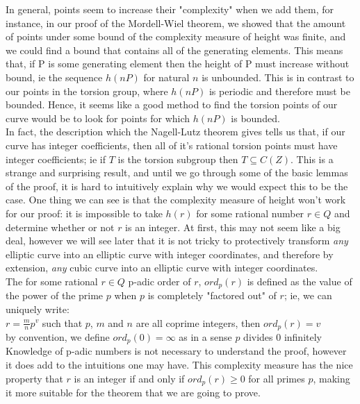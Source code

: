 \documentclass{article}
\begin{document}
In general, points seem to increase their "complexity" when we add them, for instance, in our proof of the Mordell-Wiel theorem, we showed that the amount of points under some bound of the complexity measure of height was finite, and we could find a bound that contains all of the generating elements. This means that, if P is some generating element then the height of P must increase without bound, ie the sequence $h(nP)$ for natural $n$ is unbounded. This is in contrast to our points in the torsion group, where $h(nP)$ is periodic and therefore must be bounded. Hence, it seems like a good method to find the torsion points of our curve would be to look for points for which $h(nP)$ is bounded.\\

In fact, the description which the Nagell-Lutz theorem gives tells us that, if our curve has integer coefficients, then all of it's rational torsion points must have integer coefficients; ie if $T$ is the torsion subgroup then $T \subseteq C(Z)$. This is a strange and surprising result, and until we go through some of the basic lemmas of the proof, it is hard to intuitively explain why we would expect this to be the case. One thing we can see is that the complexity measure of height won't work for our proof: it is impossible to take $h(r)$ for some rational number $r \in Q$ and determine whether or not $r$ is an integer. At first, this may not seem like a big deal, however we will see later that it is not tricky to protectively transform \emph{any} elliptic curve into an elliptic curve with integer coordinates, and therefore by extension, \emph{any} cubic curve into an elliptic curve with integer coordinates.\\

The for some rational $r \in Q$ p-adic order of $r$, $ord_p(r)$ is defined as the value of the power of the prime $p$ when $p$ is completely "factored out" of $r$; ie, we can uniquely write:\\

$r = \frac{m}{n}p^v$ such that $p$, $m$ and $n$ are all coprime integers, then $ord_p(r) = v$\\

by convention, we define $ord_p(0) = \infty$ as in a sense $p$ divides $0$ infinitely\\

Knowledge of p-adic numbers is not necessary to understand the proof, however it does add to the intuitions one may have. This complexity measure has the nice property that $r$ is an integer if and only if $ord_p(r) \geq 0$ for all primes $p$, making it more suitable for the theorem that we are going to prove. \\
\end{document}
